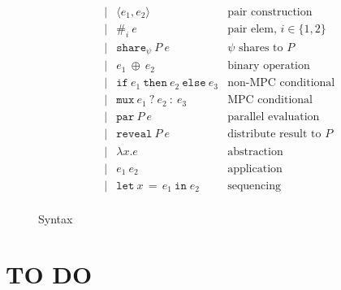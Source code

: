\documentclass[10pt]{article}
\newcommand{\kw}[1]{\ensuremath{\mathtt{#1}}}
\newcommand{\isec}{\ensuremath{\mathtt{pmap}}}
\newcommand{\ebinop}[2]{\ensuremath{{#1}~\oplus~{#2}}}
\newcommand{\elet}[3]{\ensuremath{\kw{let}~#1\, =\, #2~\kw{in}\;{#3}}}
\newcommand{\epar}[2]{\ensuremath{\kw{par}~{#1}~{#2}}}
\newcommand{\esec}[2]{\ensuremath{\kw{sec}~{#1}~{#2}}}
\newcommand{\ereveal}[2]{\ensuremath{\kw{reveal}~{#1}~{#2}}}
\newcommand{\econd}[3]{\ensuremath{\kw{if}~{#1}~\kw{then}~{#2}~\kw{else}~{#3}}}
\newcommand{\emux}[3]{\ensuremath{\kw{mux}~{#1}~\kw{?}~{#2}~\kw{:}~{#3}}}
\newcommand{\eshare}[3]{\ensuremath{\kw{share}_{#1}~{#2}~{#3}}}
\newcommand{\esharemap}[3]{\ensuremath{\kw{sharemap}_{#1}~{#2}~{#3}}}
\newcommand{\epair}[2]{\ensuremath{\langle {#1}, {#2} \rangle}}
\newcommand{\eproj}[2]{\ensuremath{\kw{\#}}_{#1}~{#2}}
\newcommand{\elam}[2]{\ensuremath{\lambda {#1}.{#2}}}
\newcommand{\eapp}[2]{\ensuremath{{#1}~{#2}}}
\begin{document}
\begin{figure}[h]
\[\begin{array}{rlcll}
                       && \mid & \epair{e_1}{e_2} & \text{pair construction}\\
                       && \mid & \eproj{i}{e} & \text{pair elem, }i \in \{1,2\}\\
                       && \mid & \eshare{\psi}{P}{e} & \text{$\psi$ shares to $P$} \\
                       && \mid & \ebinop{e_1}{e_2}  & \text{binary operation} \\
                       && \mid & \econd{e_1}{e_2}{e_3}  & \text{non-MPC conditional} \\
                       && \mid & \emux{e_1}{e_2}{e_3}  & \text{MPC conditional} \\
                       && \mid & \epar{P}{e} & \text{parallel evaluation}\\
                       && \mid & \ereveal{P}{e} & \text{distribute result to $P$}\\
                       && \mid & \elam{x}{e}  & \text{abstraction} \\
                       && \mid & \eapp{e_1}{e_2}  & \text{application} \\
                       && \mid & \elet{x}{e_1}{e_2}  & \text{sequencing} \\
  \end{array}
  \]
  \caption{Syntax}
  \label{fig:syntax}
\end{figure}

\section{TO DO}
\end{document}
